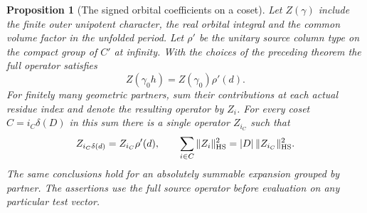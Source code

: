 \documentclass[a4paper,11pt]{article}
\newtheorem{proposition}{Proposition}[section]
\theoremstyle{definition}
\theoremstyle{remark}
\numberwithin{equation}{section}
\begin{document}
\begin{proposition}[The signed orbital coefficients on a coset]
\leavevmode\label{prop:partnerweights531}
Let \(Z(\gamma)\) include the finite outer unipotent character,
the real orbital integral and the common volume factor in the
unfolded period. Let \(\rho'\) be the unitary source column type
on the compact group of \(C'\) at infinity. With the choices
of the preceding theorem the full operator satisfies
\[
              Z(\gamma_0 h)=Z(\gamma_0)\rho'(d).
\]
For finitely many geometric partners, sum their contributions at
each actual residue index and denote the resulting operator by
\(Z_i\). For every coset \(C=i_C\delta(D)\) in this sum there
is a single operator \(Z_{i_C}\) such that
\[
       Z_{i_C\delta(d)}=Z_{i_C}\rho'(d),\qquad
       \sum_{i\in C}\|Z_i\|_{\rm HS}^2=|D|\,\|Z_{i_C}\|_{\rm HS}^2 .
\]
The same conclusions hold for an absolutely summable expansion
grouped by partner. The assertions use the full source operator
before evaluation on any particular test vector.
\end{proposition}
\end{document}

